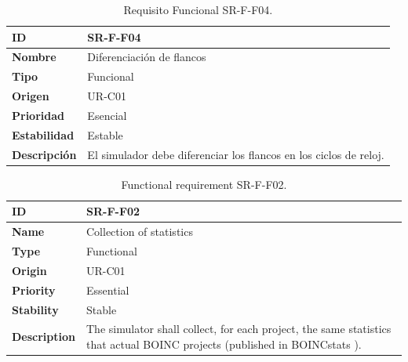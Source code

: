 \begin{center}
\begin{table}[htbp]
\centering
\begin{tabular}{@{}p{2.5cm} p{9cm}@{}} 
\toprule
\textbf{ID} 				& SR-F-F04 \\
\midrule
\textbf{Nombre} 			& Diferenciación de flancos \\
\midrule
\textbf{Tipo} 			& Funcional \\
\midrule
\textbf{Origen} 			& UR-C01 \\
\midrule
\textbf{Prioridad}		& Esencial \\
\midrule
\textbf{Estabilidad} 		& Estable \\
\midrule
\textbf{Descripción} 	& El simulador debe diferenciar los flancos en los ciclos de reloj. \\
\bottomrule
\end{tabular}
\caption{Requisito Funcional SR-F-F04.}
\label{tab:srff00}
\end{table}
\end{center}

\begin{center}
\begin{table}[htbp]
\centering
\begin{tabular}{@{}p{2.5cm} p{9cm}@{}} 
\toprule
\textbf{ID} 				& SR-F-F02\\
\midrule
\textbf{Name} 			& Collection of statistics \\
\midrule
\textbf{Type} 			& Functional \\
\midrule
\textbf{Origin} 			& UR-C01 \\
\midrule
\textbf{Priority}		& Essential \\
\midrule
\textbf{Stability} 		& Stable \\
\midrule
\textbf{Description} 	& The simulator shall collect, for each project, the same statistics that actual BOINC projects (published in BOINCstats \cite{BOINC2016}). \\
\bottomrule
\end{tabular}
\caption{Functional requirement SR-F-F02.}
\label{tab:srff02}
\end{table}
\end{center}

